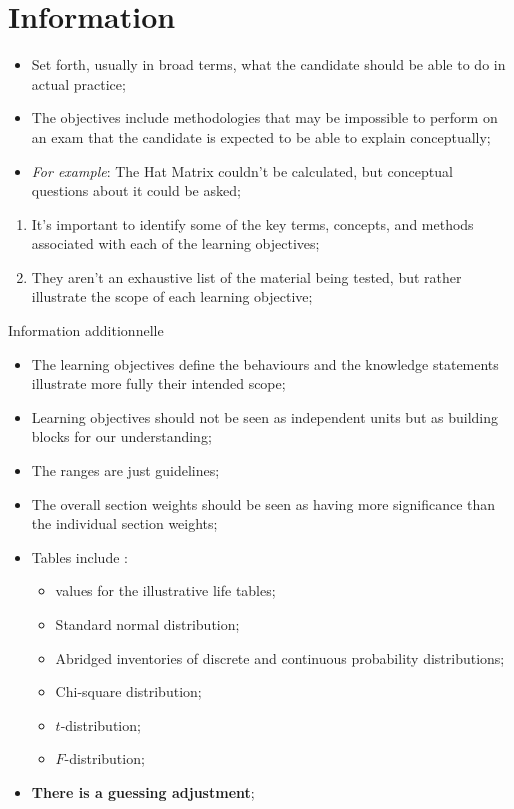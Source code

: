 \section{Information}

\begin{distributions}[Objectives]
\begin{itemize}
	\item	Set forth, usually in broad terms, what the candidate should be able to do in actual practice;
	\item	The objectives include methodologies that may be impossible to perform on an exam that the candidate is expected to be able to explain conceptually;
	\item	\textit{For example}: The Hat Matrix couldn't be calculated, but conceptual questions about it could be asked;
\end{itemize}
\end{distributions}

\begin{outcomes}
\begin{enumerate}
	\item	It's important to identify some of the key terms, concepts, and methods associated with each of the learning objectives;
	\item	They aren't an exhaustive list of the material being tested, but rather illustrate the scope of each learning objective;
\end{enumerate}
\end{outcomes}

\begin{CHPT_SUMM}{Information additionnelle}
	\begin{itemize}
		\item	The learning objectives define the behaviours and the knowledge statements illustrate more fully their intended scope;
		\item	Learning objectives should not be seen as independent units but as building blocks for our understanding;
		\item	The ranges are just guidelines;
		\item	The overall section weights should be seen as having more significance than the individual section weights;
		\item	Tables include :
			\begin{itemize}
			\item	values for the illustrative life tables;
			\item	Standard normal distribution;
			\item	Abridged inventories of discrete and continuous probability distributions;
			\item	Chi-square distribution;
			\item	$t$-distribution;
			\item	$F$-distribution;
			\end{itemize}
		\item	\textbf{There is a guessing adjustment};
	\end{itemize}
\end{CHPT_SUMM}
